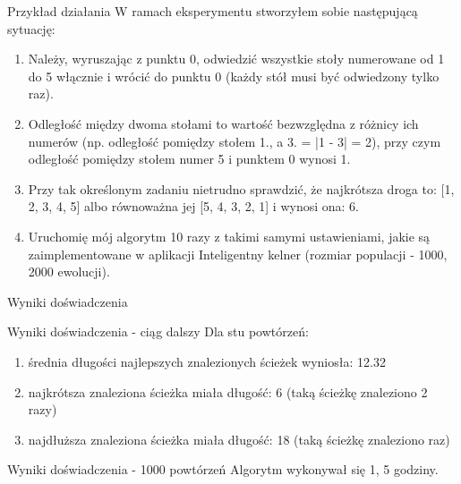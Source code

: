 \documentclass[a4paper,10pt]{beamer}
\begin{document}
			\begin{frame}{Przykład działania}
				W ramach eksperymentu stworzyłem sobie następującą sytuację:
				\begin{enumerate}
					\item Należy, wyruszając z punktu 0, odwiedzić wszystkie stoły numerowane od 1 do 5 włącznie i wrócić do punktu 0 (każdy stół musi być odwiedzony tylko raz). 
					\item Odległość między dwoma stołami to wartość bezwzględna z różnicy ich numerów (np. odległość pomiędzy stołem 1., a 3. = |1 - 3| = 2), przy czym odległość pomiędzy stołem numer 5 i punktem 0 wynosi 1.
					\item Przy tak określonym zadaniu nietrudno sprawdzić, że najkrótsza droga to: [1, 2, 3, 4, 5] albo równoważna jej [5, 4, 3, 2, 1] i wynosi ona: 6.
					\item Uruchomię mój algorytm 10 razy z takimi samymi ustawieniami, jakie są zaimplementowane w aplikacji Inteligentny kelner (rozmiar populacji - 1000, 2000 ewolucji).
				\end{enumerate}
			\end{frame}
		\begin{frame}{Wyniki doświadczenia}
		\end{frame}
		\begin{frame}{Wyniki doświadczenia - ciąg dalszy}
			Dla stu powtórzeń:
			\begin{enumerate}
				\item średnia długości najlepszych znalezionych ścieżek wyniosła: 12.32
				\item najkrótsza znaleziona ścieżka miała długość: 6 (taką ścieżkę znaleziono 2 razy)
				\item najdłuższa znaleziona ścieżka miała długość: 18 (taką ścieżkę znaleziono raz)
			\end{enumerate}
		\end{frame}
		\begin{frame}{Wyniki doświadczenia - 1000 powtórzeń}
			Algorytm wykonywał się 1, 5 godziny.
		\end{frame}
\end{document}
